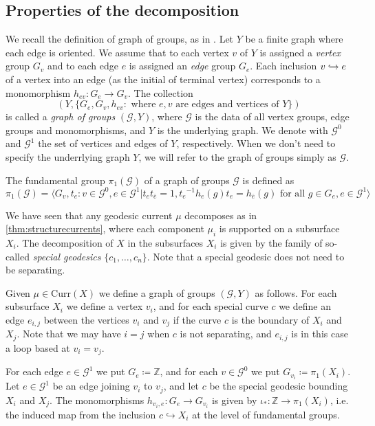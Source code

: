 \documentclass[12pt,article]{amsart}
\numberwithin{equation}{section}
\numberwithin{figure}{section}
\theoremstyle{definition}
\theoremstyle{plain}
\newcommand\Z{\ensuremath{\mathbb{Z}}}
\begin{document}
\subsection{Properties of the decomposition}


We recall the definition of graph of groups, as in \cite[10.2]{Kap00:Kapovich2000HyperbolicMA}. Let $Y$ be a finite graph where each edge is oriented. We assume that to each vertex $v$ of $Y$ is assigned a \emph{vertex} group $G_v$ and to each edge $e$ is assigned an \emph{edge} group $G_e$. Each inclusion $v \xhookrightarrow{} e$ of a vertex into an edge (as the initial of terminal vertex) corresponds to a monomorphism
$h_{ev} \colon G_e \to G_v$.
The collection
\[
(Y, \{ G_e, G_v, h_{ev} \colon \mbox{ where } e,v  \mbox{ are edges and vertices of } Y \} )
\]
is called a \emph{graph of groups} $(\mathcal{G}, Y)$, where $\mathcal{G}$ is the data of all vertex groups, edge groups and monomorphisms, and $Y$ is the underlying graph. We denote with $\mathcal{G}^0$ and $\mathcal{G}^1$ the set of vertices and edges of $Y$, respectively. When we don't need to specify the underrlying graph $Y$, we will refer to the graph of groups simply as $\mathcal{G}$.

The fundamental group $\pi_1(\mathcal{G})$ of a graph of groups $\mathcal{G}$ is defined as 
\[
\pi_1 (\mathcal{G}) = \langle G_v , t_e : v \in \mathcal{G}^0 , e \in \mathcal{G}^1 | t_e t_{\overline{e}} = 1 , {t_e}^{-1} h_e (g) t_e = h_{\overline{e}} (g) \text{ for all } g \in G_e , e \in \mathcal{G}^1 \rangle
\]

We have seen that any geodesic current $\mu$ decomposes as in \ref{thm:structurecurrents}, where each component $\mu_i$ is supported on a subsurface $X_i$. The decomposition of $X$ in the subsurfaces $X_i$ is given by the family of so-called \emph{special geodesics} $\{c_1 , \dots , c_n \}$.
Note that a special geodesic does not need to be separating.

Given $\mu \in \mathrm{Curr}(X)$ we define a graph of groups $(\mathcal{G}, Y)$ as follows.
For each subsurface $X_i$ we define a vertex $v_i$, and for each special curve $c$ we define an edge $e_{i,j}$ between the vertices $v_i$ and $v_j$ if the curve $c$ is the boundary of $X_i$ and $X_j$. Note that we may have $i = j$ when $c$ is not separating, and $e_{i,j}$ is in this case a loop based at $v_i = v_j$. 

For each edge $e \in \mathcal{G}^1$ we put $G_e \coloneqq \Z$, and for each $v \in \mathcal{G}^0$ we put $G_{v_i} \coloneqq \pi_1 (X_i)$. Let $e \in \mathcal{G}^1$ be an edge joining $v_i$ to $v_j$, and let $c$ be the special geodesic bounding $X_i$ and $X_j$. The monomorphisms $h_{v_i,e} : G_e \to G_{v_i}$ is given by $\iota_* : \Z \to \pi_1(X_i)$, i.e. the induced map from the inclusion $c \hookrightarrow X_i$ at the level of fundamental groups. 
\end{document}

